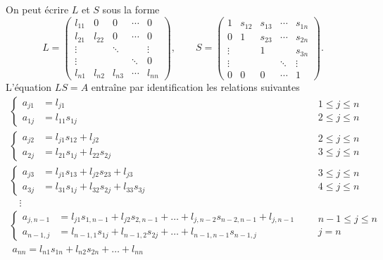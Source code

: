 On peut écrire $L$ et $S$ sous la forme
\[
  L = \begin{pmatrix}
    l_{11} & 0 & 0 & \cdots & 0\\
    l_{21} & l_{22} & 0 & \cdots & 0\\
    \vdots & & \ddots & & \vdots\\
    \vdots & & & \ddots & 0\\
    l_{n1} & l_{n2} & l_{n3} & \cdots & l_{nn}
  \end{pmatrix},
  \qquad
  S = \begin{pmatrix}
    1 & s_{12} & s_{13} & \cdots & s_{1n}\\
    0 & 1 & s_{23} & \cdots & s_{2n}\\
    \vdots & & 1 & & s_{3n}\\
    \vdots & & & \ddots & \vdots\\
    0 & 0 & 0 & \cdots & 1
  \end{pmatrix}.
\]
L'équation $LS = A$ entraîne par identification les relations suivantes
\[
\begin{array}{ll}
  \left\{\begin{aligned}
    a_{j1} &= l_{j1}\\
    a_{1j} &= l_{11}s_{1j}
  \end{aligned}\right.
  &
  \begin{aligned}
    &1 \le j \le n\\
    &2 \le j \le n
  \end{aligned}
  \\[1.2em]
  \left\{\begin{aligned}
    a_{j2} &= l_{j1}s_{12} + l_{j2}\\
    a_{2j} &= l_{21}s_{1j} + l_{22}s_{2j}
  \end{aligned}\right.
  &
  \begin{aligned}
    &2 \le j \le n\\
    &3 \le j \le n
  \end{aligned}
  \\[1.2em]
  \left\{\begin{aligned}
    a_{j3} &= l_{j1}s_{13} + l_{j2}s_{23} + l_{j3}\\
    a_{3j} &= l_{31}s_{1j} + l_{32}s_{2j} + l_{33}s_{3j}
  \end{aligned}\right.
  &
  \begin{aligned}
    &3 \le j \le n\\
    &4 \le j \le n
  \end{aligned}
  \\
  \quad\vdots & \\
  \left\{\begin{aligned}
    a_{j,n-1} &= l_{j1}s_{1,n-1} + l_{j2}s_{2,n-1} + \dots + l_{j,n-2}s_{n-2,n-1} + l_{j,n-1}\\
    a_{n-1,j} &= l_{n-1,1}s_{1j} + l_{n-1,2}s_{2j} + \dots + l_{n-1,n-1}s_{n-1,j}
  \end{aligned}\right.
  &
  \begin{aligned}
    &n-1 \le j \le n\\
    &j = n
  \end{aligned}
  \\[1.2em]
  \;a_{nn} = l_{n1}s_{1n} + l_{n2}s_{2n} + \dots + l_{nn} &
\end{array}
\]

